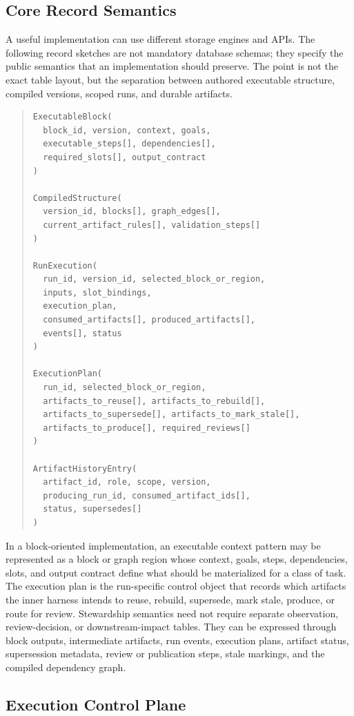 \documentclass{article}
\begin{document}
\subsection{Core Record Semantics}

A useful implementation can use different storage engines and APIs. The following record sketches are not mandatory database schemas; they specify the public semantics that an implementation should preserve. The point is not the exact table layout, but the separation between authored executable structure, compiled versions, scoped runs, and durable artifacts.

\begin{quote}
\small
\begin{verbatim}
ExecutableBlock(
  block_id, version, context, goals,
  executable_steps[], dependencies[],
  required_slots[], output_contract
)

CompiledStructure(
  version_id, blocks[], graph_edges[],
  current_artifact_rules[], validation_steps[]
)

RunExecution(
  run_id, version_id, selected_block_or_region,
  inputs, slot_bindings,
  execution_plan,
  consumed_artifacts[], produced_artifacts[],
  events[], status
)

ExecutionPlan(
  run_id, selected_block_or_region,
  artifacts_to_reuse[], artifacts_to_rebuild[],
  artifacts_to_supersede[], artifacts_to_mark_stale[],
  artifacts_to_produce[], required_reviews[]
)

ArtifactHistoryEntry(
  artifact_id, role, scope, version,
  producing_run_id, consumed_artifact_ids[],
  status, supersedes[]
)
\end{verbatim}
\end{quote}

In a block-oriented implementation, an executable context pattern may be represented as a block or graph region whose context, goals, steps, dependencies, slots, and output contract define what should be materialized for a class of task. The execution plan is the run-specific control object that records which artifacts the inner harness intends to reuse, rebuild, supersede, mark stale, produce, or route for review. Stewardship semantics need not require separate observation, review-decision, or downstream-impact tables. They can be expressed through block outputs, intermediate artifacts, run events, execution plans, artifact status, supersession metadata, review or publication steps, stale markings, and the compiled dependency graph.

\subsection{Execution Control Plane}
\end{document}
